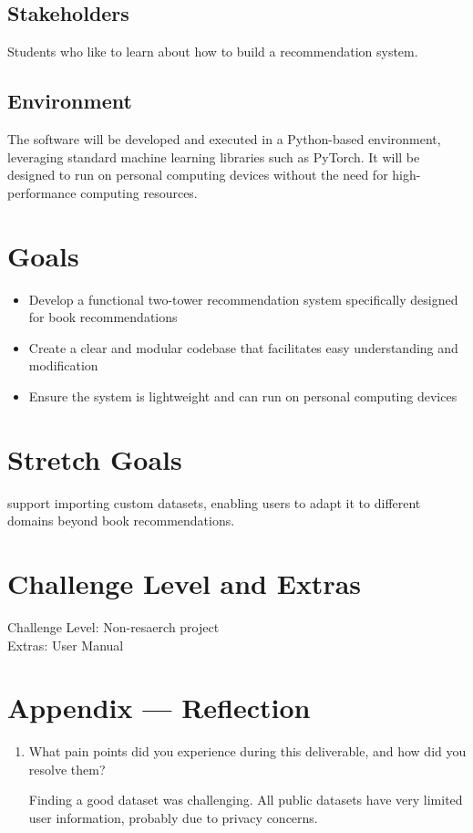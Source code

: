 \documentclass{article}
\begin{document}
\subsection{Stakeholders}

Students who like to learn about how to build a recommendation system.

\subsection{Environment}
The software will be developed and executed in a Python-based environment, leveraging standard machine learning libraries such as PyTorch. It will be designed to run on personal computing devices without the need for high-performance computing resources.

\section{Goals}
\begin{itemize}
    \item Develop a functional two-tower recommendation system specifically designed for book recommendations
    \item Create a clear and modular codebase that facilitates easy understanding and modification
    \item Ensure the system is lightweight and can run on personal computing devices
\end{itemize}

\section{Stretch Goals}
support importing custom datasets, enabling users to adapt it to different domains beyond book recommendations.
\section{Challenge Level and Extras}
Challenge Level: Non-resaerch project \\
Extras: User Manual


\newpage{}

\section*{Appendix --- Reflection}

\begin{enumerate}
    \item What pain points did you experience during this deliverable, and how did you resolve them?
    
        Finding a good dataset was challenging. All public datasets have very limited user information, probably due to privacy concerns.

\end{enumerate}  
\end{document}
